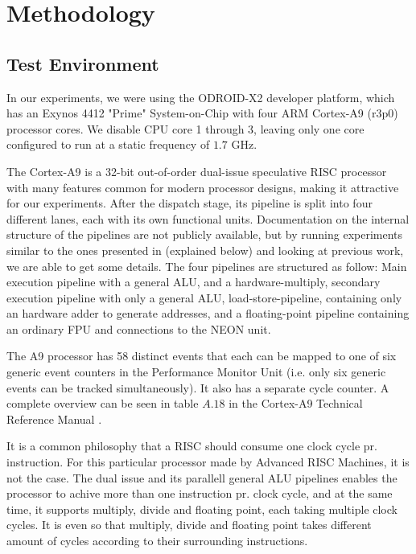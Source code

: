 \section{Methodology}


\subsection{Test Environment}
In our experiments, we were using the ODROID-X2 \cite{odroid-x2} developer
platform, which has an Exynos 4412 "Prime" System-on-Chip with four ARM
Cortex-A9 (r3p0) processor cores. We disable CPU core 1 through 3, leaving only
one core configured to run at a static frequency of $1.7$ GHz.

The Cortex-A9 is a 32-bit out-of-order dual-issue speculative RISC processor
with many features common for modern processor designs, making it attractive for
our experiments. After the dispatch stage, its pipeline is split into four
different lanes, each with its own functional units. Documentation on the
internal structure of the pipelines are not publicly available, but by running
experiments similar to the ones presented in \cite{paper} (explained below) and
looking at previous work\cite{armtech}\cite{7cpu}\cite{lotofdocs}, we are able
to get some details. The four pipelines are structured as follow: Main execution
pipeline with a general ALU, and a hardware-multiply, secondary execution
pipeline with only a general ALU, load-store-pipeline, containing only an
hardware adder to generate addresses, and a floating-point pipeline containing
an ordinary FPU and connections to the NEON unit.

The A9 processor has 58 distinct events that each can be mapped to one of six
generic event counters in the Performance Monitor Unit (i.e. only six generic
events can be tracked simultaneously). It also has a separate cycle counter. A
complete overview can be seen in table $A.18$ in the Cortex-A9 Technical
Reference Manual \cite{armtech}.


It is a common philosophy that a RISC should consume one clock cycle pr.
instruction\cite{unknown}. For this particular processor made by Advanced RISC
Machines, it is not the case. The dual issue and its parallell general ALU
pipelines enables the processor to achive more than one instruction pr. clock
cycle, and at the same time, it supports multiply, divide and floating point,
each taking multiple clock cycles. It is even so that multiply, divide and
floating point takes different amount of cycles according to their surrounding
instructions.



